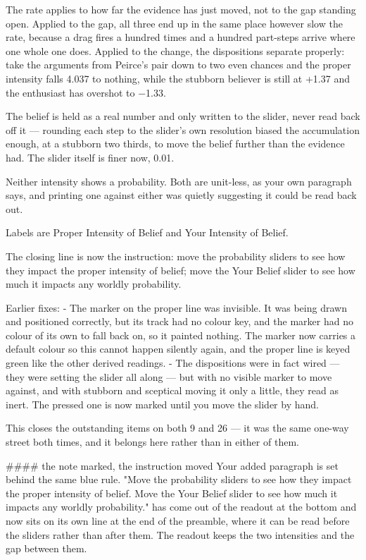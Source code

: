 The rate applies to how far the evidence has just moved, not to the gap standing
open. Applied to the gap, all three end up in the same place however slow the
rate, because a drag fires a hundred times and a hundred part-steps arrive where
one whole one does. Applied to the change, the dispositions separate properly:
take the arguments from Peirce's pair down to two even chances and the proper
intensity falls 4.037 to nothing, while the stubborn believer is still at +1.37
and the enthusiast has overshot to −1.33.

The belief is held as a real number and only written to the slider, never read
back off it — rounding each step to the slider's own resolution biased the
accumulation enough, at a stubborn two thirds, to move the belief further than
the evidence had. The slider itself is finer now, 0.01.

Neither intensity shows a probability. Both are unit-less, as your own paragraph
says, and printing one against either was quietly suggesting it could be read
back out.

Labels are Proper Intensity of Belief and Your Intensity of Belief.

The closing line is now the instruction: move the probability sliders to see how
they impact the proper intensity of belief; move the Your Belief slider to see
how much it impacts any worldly probability.

Earlier fixes:
 - The marker on the proper line was invisible. It was being drawn and
   positioned correctly, but its track had no colour key, and the marker had no
   colour of its own to fall back on, so it painted nothing. The marker now
   carries a default colour so this cannot happen silently again, and the
   proper line is keyed green like the other derived readings.
 - The dispositions were in fact wired — they were setting the slider all
   along — but with no visible marker to move against, and with stubborn and
   sceptical moving it only a little, they read as inert. The pressed one is
   now marked until you move the slider by hand.

This closes the outstanding items on both 9 and 26 — it was the same one-way
street both times, and it belongs here rather than in either of them.

#### the note marked, the instruction moved
Your added paragraph is set behind the same blue rule. "Move the probability
sliders to see how they impact the proper intensity of belief. Move the Your
Belief slider to see how much it impacts any worldly probability." has come out
of the readout at the bottom and now sits on its own line at the end of the
preamble, where it can be read before the sliders rather than after them. The
readout keeps the two intensities and the gap between them.


